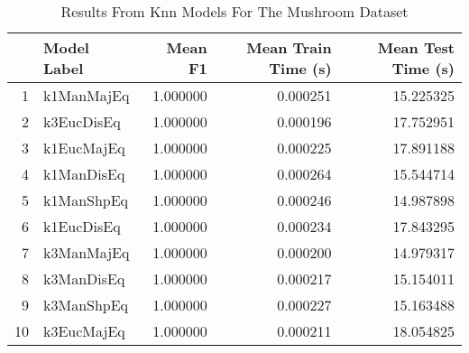 \begin{table}
\centering
\caption{Results From Knn Models For The Mushroom Dataset}
\label{tab:knn_results_mushroom}
\begin{tabular}{rlrrr}
\toprule
 & Model Label & Mean F1 & Mean Train Time (s) & Mean Test Time (s) \\
\midrule
1 & k1ManMajEq & 1.000000 & 0.000251 & 15.225325 \\
2 & k3EucDisEq & 1.000000 & 0.000196 & 17.752951 \\
3 & k1EucMajEq & 1.000000 & 0.000225 & 17.891188 \\
4 & k1ManDisEq & 1.000000 & 0.000264 & 15.544714 \\
5 & k1ManShpEq & 1.000000 & 0.000246 & 14.987898 \\
6 & k1EucDisEq & 1.000000 & 0.000234 & 17.843295 \\
7 & k3ManMajEq & 1.000000 & 0.000200 & 14.979317 \\
8 & k3ManDisEq & 1.000000 & 0.000217 & 15.154011 \\
9 & k3ManShpEq & 1.000000 & 0.000227 & 15.163488 \\
10 & k3EucMajEq & 1.000000 & 0.000211 & 18.054825 \\
\bottomrule
\end{tabular}
\end{table}
